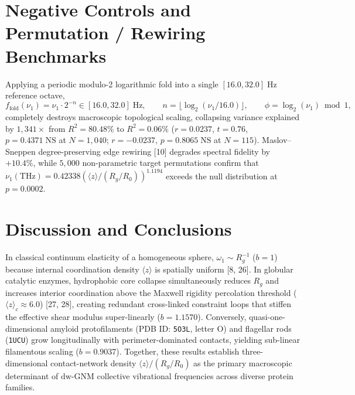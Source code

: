 \documentclass[11pt,onecolumn,letterpaper]{article}
\begin{document}
\section{Negative Controls and Permutation / Rewiring Benchmarks}
Applying a periodic modulo-2 logarithmic fold into a single $[16.0, 32.0]\;\mathrm{Hz}$ reference octave,
\begin{equation}
f_{\mathrm{fold}}(\nu_1) = \nu_1 \cdot 2^{-n} \in [16.0, 32.0]\;\mathrm{Hz}, \qquad n = \lfloor \log_2(\nu_1 / 16.0) \rfloor, \qquad \phi = \log_2(\nu_1) \bmod 1,
\end{equation}
completely destroys macroscopic topological scaling, collapsing variance explained by $1,341\times$ from $R^2 = 80.48\%$ to $R^2 = 0.06\%$ ($r = 0.0237$, $t = 0.76$, $p = 0.4371\;\mathrm{NS}$ at $N = 1,040$; $r = -0.0237$, $p = 0.8065\;\mathrm{NS}$ at $N = 115$). Maslov--Sneppen degree-preserving edge rewiring [10] degrades spectral fidelity by $+10.4\%$, while $5,000$ non-parametric target permutations confirm that $\nu_1(\mathrm{THz}) = 0.42338 (\langle z \rangle / (R_g / R_0))^{1.1194}$ exceeds the null distribution at $p = 0.0002$.

\section{Discussion and Conclusions}
In classical continuum elasticity of a homogeneous sphere, $\omega_1 \sim R_g^{-1}$ ($b = 1$) because internal coordination density $\langle z \rangle$ is spatially uniform [8, 26]. In globular catalytic enzymes, hydrophobic core collapse simultaneously reduces $R_g$ and increases interior coordination above the Maxwell rigidity percolation threshold ($\langle z \rangle_c \approx 6.0$) [27, 28], creating redundant cross-linked constraint loops that stiffen the effective shear modulus super-linearly ($b = 1.1570$). Conversely, quasi-one-dimensional amyloid protofilaments (PDB ID: \texttt{5O3L}, letter O) and flagellar rods (\texttt{1UCU}) grow longitudinally with perimeter-dominated contacts, yielding sub-linear filamentous scaling ($b = 0.9037$). Together, these results establish three-dimensional contact-network density $\langle z \rangle / (R_g / R_0)$ as the primary macroscopic determinant of $\mathrm{dw\text{-}GNM}$ collective vibrational frequencies across diverse protein families.
\end{document}
